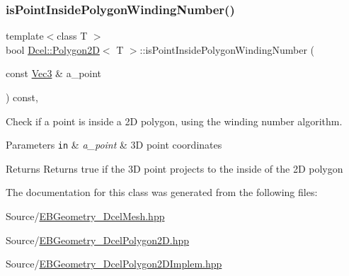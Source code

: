 \subsubsection{\texorpdfstring{is\+Point\+Inside\+Polygon\+Winding\+Number()}{isPointInsidePolygonWindingNumber()}}
{\footnotesize\ttfamily template$<$class T $>$ \\
bool \hyperlink{classDcel_1_1Polygon2D}{Dcel\+::\+Polygon2D}$<$ T $>$\+::is\+Point\+Inside\+Polygon\+Winding\+Number (\begin{DoxyParamCaption}\item[{const \hyperlink{classDcel_1_1Polygon2D_a46e9686210f09464e8f5ad13300717b9}{Vec3} \&}]{a\+\_\+point }\end{DoxyParamCaption}) const\hspace{0.3cm}{\ttfamily [inline]}, {\ttfamily [noexcept]}}



Check if a point is inside a 2D polygon, using the winding number algorithm. 


\begin{DoxyParams}[1]{Parameters}
\mbox{\tt in}  & {\em a\+\_\+point} & 3D point coordinates \\
\hline
\end{DoxyParams}
\begin{DoxyReturn}{Returns}
Returns true if the 3D point projects to the inside of the 2D polygon 
\end{DoxyReturn}


The documentation for this class was generated from the following files\+:\begin{DoxyCompactItemize}
\item 
Source/\hyperlink{EBGeometry__DcelMesh_8hpp}{E\+B\+Geometry\+\_\+\+Dcel\+Mesh.\+hpp}\item 
Source/\hyperlink{EBGeometry__DcelPolygon2D_8hpp}{E\+B\+Geometry\+\_\+\+Dcel\+Polygon2\+D.\+hpp}\item 
Source/\hyperlink{EBGeometry__DcelPolygon2DImplem_8hpp}{E\+B\+Geometry\+\_\+\+Dcel\+Polygon2\+D\+Implem.\+hpp}\end{DoxyCompactItemize}
